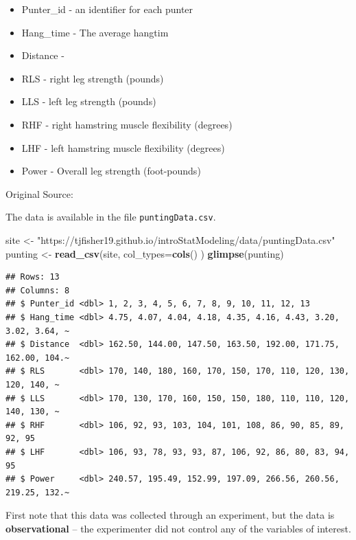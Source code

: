 \documentclass[
]{book}
\newenvironment{Shaded}{\begin{snugshade}}{\end{snugshade}}
\newcommand{\AttributeTok}[1]{\textcolor[rgb]{0.13,0.29,0.53}{#1}}
\newcommand{\FunctionTok}[1]{\textcolor[rgb]{0.13,0.29,0.53}{\textbf{#1}}}
\newcommand{\NormalTok}[1]{#1}
\newcommand{\OtherTok}[1]{\textcolor[rgb]{0.56,0.35,0.01}{#1}}
\newcommand{\StringTok}[1]{\textcolor[rgb]{0.31,0.60,0.02}{#1}}
\providecommand{\tightlist}{%
  \setlength{\itemsep}{0pt}\setlength{\parskip}{0pt}}
\begin{document}
\begin{itemize}
\tightlist
\item
  Punter\_id - an identifier for each punter
\item
  Hang\_time - The average hangtim
\item
  Distance -
\item
  RLS - right leg strength (pounds)
\item
  LLS - left leg strength (pounds)
\item
  RHF - right hamstring muscle flexibility (degrees)
\item
  LHF - left hamstring muscle flexibility (degrees)
\item
  Power - Overall leg strength (foot-pounds)
\end{itemize}

Original Source: \citet{VTpunting1983}

The data is available in the file \texttt{puntingData.csv}.

\begin{Shaded}
\begin{Highlighting}[]
\NormalTok{site }\OtherTok{\textless{}{-}} \StringTok{"https://tjfisher19.github.io/introStatModeling/data/puntingData.csv"}
\NormalTok{punting }\OtherTok{\textless{}{-}} \FunctionTok{read\_csv}\NormalTok{(site, }\AttributeTok{col\_types=}\FunctionTok{cols}\NormalTok{() )}
\FunctionTok{glimpse}\NormalTok{(punting)}
\end{Highlighting}
\end{Shaded}

\begin{verbatim}
## Rows: 13
## Columns: 8
## $ Punter_id <dbl> 1, 2, 3, 4, 5, 6, 7, 8, 9, 10, 11, 12, 13
## $ Hang_time <dbl> 4.75, 4.07, 4.04, 4.18, 4.35, 4.16, 4.43, 3.20, 3.02, 3.64, ~
## $ Distance  <dbl> 162.50, 144.00, 147.50, 163.50, 192.00, 171.75, 162.00, 104.~
## $ RLS       <dbl> 170, 140, 180, 160, 170, 150, 170, 110, 120, 130, 120, 140, ~
## $ LLS       <dbl> 170, 130, 170, 160, 150, 150, 180, 110, 110, 120, 140, 130, ~
## $ RHF       <dbl> 106, 92, 93, 103, 104, 101, 108, 86, 90, 85, 89, 92, 95
## $ LHF       <dbl> 106, 93, 78, 93, 93, 87, 106, 92, 86, 80, 83, 94, 95
## $ Power     <dbl> 240.57, 195.49, 152.99, 197.09, 266.56, 260.56, 219.25, 132.~
\end{verbatim}

First note that this data was collected through an experiment, but the data is \textbf{observational} -- the experimenter did not control any of the variables of interest.
\end{document}
